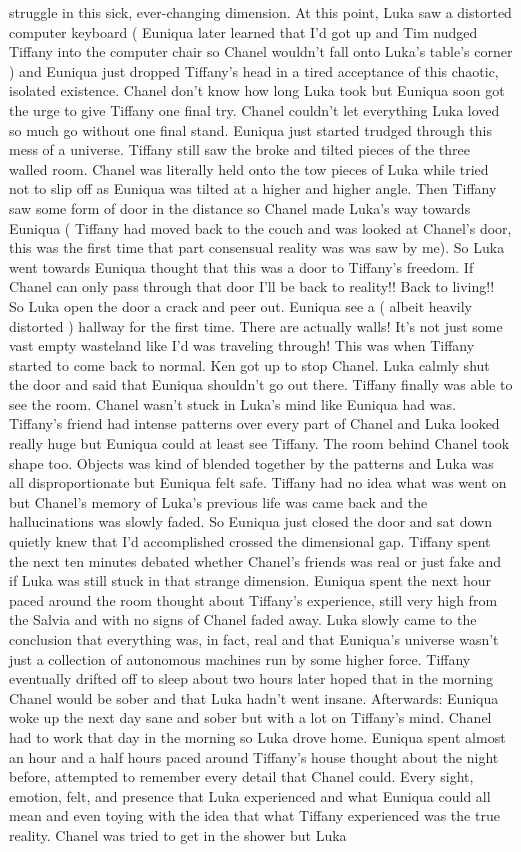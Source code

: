 \documentclass[12pt]{book}
\begin{document}
struggle in this sick, ever-changing dimension. At this point, Luka saw a distorted computer keyboard ( Euniqua later learned that I'd got up and Tim nudged Tiffany into the computer chair so Chanel wouldn't fall onto Luka's table's corner ) and Euniqua just dropped Tiffany's head in a tired acceptance of this chaotic, isolated existence. Chanel don't know how long Luka took but Euniqua soon got the urge to give Tiffany one final try. Chanel couldn't let everything Luka loved so much go without one final stand. Euniqua just started trudged through this mess of a universe. Tiffany still saw the broke and tilted pieces of the three walled room. Chanel was literally held onto the tow pieces of Luka while tried not to slip off as Euniqua was tilted at a higher and higher angle. Then Tiffany saw some form of door in the distance so Chanel made Luka's way towards Euniqua ( Tiffany had moved back to the couch and was looked at Chanel's door, this was the first time that part consensual reality was was saw by me). So Luka went towards Euniqua thought that this was a door to Tiffany's freedom. If Chanel can only pass through that door I'll be back to reality!! Back to living!! So Luka open the door a crack and peer out. Euniqua see a ( albeit heavily distorted ) hallway for the first time. There are actually walls! It's not just some vast empty wasteland like I'd was traveling through! This was when Tiffany started to come back to normal. Ken got up to stop Chanel. Luka calmly shut the door and said that Euniqua shouldn't go out there. Tiffany finally was able to see the room. Chanel wasn't stuck in Luka's mind like Euniqua had was. Tiffany's friend had intense patterns over every part of Chanel and Luka looked really huge but Euniqua could at least see Tiffany. The room behind Chanel took shape too. Objects was kind of blended together by the patterns and Luka was all disproportionate but Euniqua felt safe. Tiffany had no idea what was went on but Chanel's memory of Luka's previous life was came back and the hallucinations was slowly faded. So Euniqua just closed the door and sat down quietly knew that I'd accomplished crossed the dimensional gap. Tiffany spent the next ten minutes debated whether Chanel's friends was real or just fake and if Luka was still stuck in that strange dimension. Euniqua spent the next hour paced around the room thought about Tiffany's experience, still very high from the Salvia and with no signs of Chanel faded away. Luka slowly came to the conclusion that everything was, in fact, real and that Euniqua's universe wasn't just a collection of autonomous machines run by some higher force. Tiffany eventually drifted off to sleep about two hours later hoped that in the morning Chanel would be sober and that Luka hadn't went insane. Afterwards: Euniqua woke up the next day sane and sober but with a lot on Tiffany's mind. Chanel had to work that day in the morning so Luka drove home. Euniqua spent almost an hour and a half hours paced around Tiffany's house thought about the night before, attempted to remember every detail that Chanel could. Every sight, emotion, felt, and presence that Luka experienced and what Euniqua could all mean and even toying with the idea that what Tiffany experienced was the true reality. Chanel was tried to get in the shower but Luka 
\end{document}
